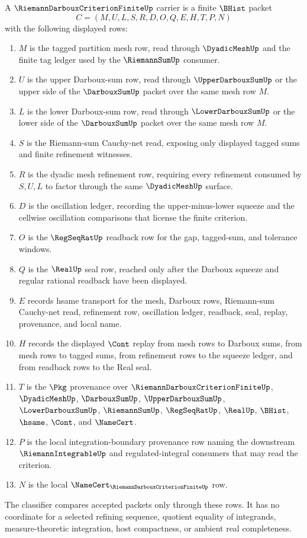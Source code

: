 \begin{definition}\label{def:riemann-darboux-criterion-finite-carrier}
A $\RiemannDarbouxCriterionFiniteUp$ carrier is a finite $\BHist$ packet
$$
C=(M,U,L,S,R,D,O,Q,E,H,T,P,N)
$$
with the following displayed rows:
\begin{enumerate}
\item $M$ is the tagged partition mesh row, read through $\DyadicMeshUp$ and the finite tag ledger used by the $\RiemannSumUp$ consumer.
\item $U$ is the upper Darboux-sum row, read through $\UpperDarbouxSumUp$ or the upper side of the $\DarbouxSumUp$ packet over the same mesh row $M$.
\item $L$ is the lower Darboux-sum row, read through $\LowerDarbouxSumUp$ or the lower side of the $\DarbouxSumUp$ packet over the same mesh row $M$.
\item $S$ is the Riemann-sum Cauchy-net read, exposing only displayed tagged sums and finite refinement witnesses.
\item $R$ is the dyadic mesh refinement row, requiring every refinement consumed by $S,U,L$ to factor through the same $\DyadicMeshUp$ surface.
\item $D$ is the oscillation ledger, recording the upper-minus-lower squeeze and the cellwise oscillation comparisons that license the finite criterion.
\item $O$ is the $\RegSeqRatUp$ readback row for the gap, tagged-sum, and tolerance windows.
\item $Q$ is the $\RealUp$ seal row, reached only after the Darboux squeeze and regular rational readback have been displayed.
\item $E$ records hsame transport for the mesh, Darboux rows, Riemann-sum Cauchy-net read, refinement row, oscillation ledger, readback, seal, replay, provenance, and local name.
\item $H$ records the displayed $\Cont$ replay from mesh rows to Darboux sums, from mesh rows to tagged sums, from refinement rows to the squeeze ledger, and from readback rows to the Real seal.
\item $T$ is the $\Pkg$ provenance over $\RiemannDarbouxCriterionFiniteUp$, $\DyadicMeshUp$, $\DarbouxSumUp$, $\UpperDarbouxSumUp$, $\LowerDarbouxSumUp$, $\RiemannSumUp$, $\RegSeqRatUp$, $\RealUp$, $\BHist$, $\hsame$, $\Cont$, and $\NameCert$.
\item $P$ is the local integration-boundary provenance row naming the downstream $\RiemannIntegrableUp$ and regulated-integral consumers that may read the criterion.
\item $N$ is the local $\NameCert_{\RiemannDarbouxCriterionFiniteUp}$ row.
\end{enumerate}
The classifier compares accepted packets only through these rows. It has no coordinate for a selected refining sequence, quotient equality of integrands, measure-theoretic integration, host compactness, or ambient real completeness.
\end{definition}

